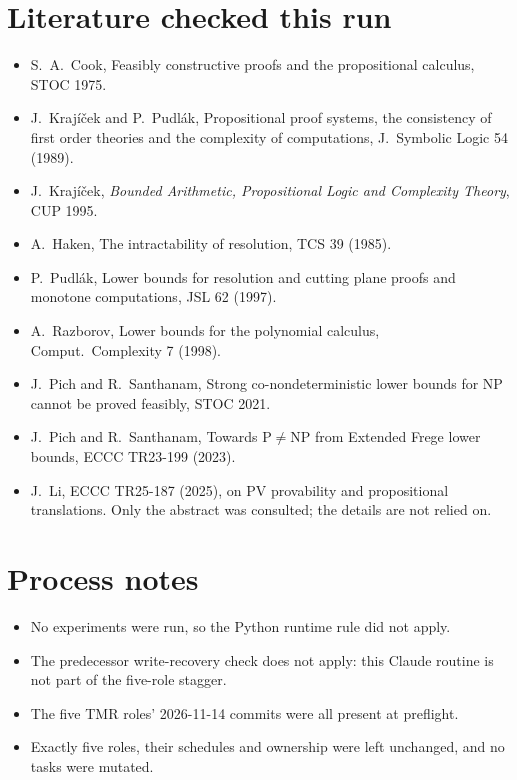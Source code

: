 \documentclass[11pt]{article}
\theoremstyle{definition}
\begin{document}
\section*{Literature checked this run}
\begin{itemize}
\item S.~A.~Cook, Feasibly constructive proofs and the propositional calculus, STOC 1975.
\item J.~Krajíček and P.~Pudlák, Propositional proof systems, the consistency of first order theories and the complexity of computations, J.~Symbolic Logic 54 (1989).
\item J.~Krajíček, \emph{Bounded Arithmetic, Propositional Logic and Complexity Theory}, CUP 1995.
\item A.~Haken, The intractability of resolution, TCS 39 (1985).
\item P.~Pudlák, Lower bounds for resolution and cutting plane proofs and monotone computations, JSL 62 (1997).
\item A.~Razborov, Lower bounds for the polynomial calculus, Comput.\ Complexity 7 (1998).
\item J.~Pich and R.~Santhanam, Strong co-nondeterministic lower bounds for NP cannot be proved feasibly, STOC 2021.
\item J.~Pich and R.~Santhanam, Towards P$\neq$NP from Extended Frege lower bounds, ECCC TR23-199 (2023).
\item J.~Li, ECCC TR25-187 (2025), on PV provability and propositional translations. Only the abstract was consulted; the details are not relied on.
\end{itemize}

\section*{Process notes}
\begin{itemize}
\item No experiments were run, so the Python runtime rule did not apply.
\item The predecessor write-recovery check does not apply: this Claude routine is not part of the five-role stagger.
\item The five TMR roles' 2026-11-14 commits were all present at preflight.
\item Exactly five roles, their schedules and ownership were left unchanged, and no tasks were mutated.
\end{itemize}
\end{document}
